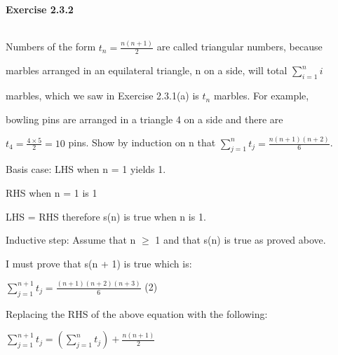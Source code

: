 \documentclass[12pt]{article}
\begin{document}
\begin{title}
    \centering
    {\LARGE\bfseries Exercise 2.3.2}
\end{title}\\

\vspace{10mm} %
Numbers of the form $t_{n} = \frac{n(n + 1)}{2}$ are called triangular numbers, because\par marbles arranged 
in an equilateral triangle, n on a side, will total $\sum_{i=1}^{n} i$\par marbles, which we saw in Exercise 
2.3.1(a) is $t_{n}$ marbles. For example,\par bowling pins are arranged in a triangle 4 on a side and there are\par
$t_{4} = \frac{4 \times 5}{2} = 10$ pins. Show by induction on n that $\sum_{j=1}^{n} t_{j} = \frac{n(n + 1)(n + 2)}{6}$.

\vspace{5mm} %

Basis case: LHS when n = 1 yields 1.\par

\vspace{5mm} %

RHS when n = 1 is 1\par

LHS = RHS therefore s(n) is true when n is 1.\par

Inductive step: Assume that n $\geq$ 1 and that s(n) is true as proved above.\par I must prove that s(n + 1) is true which is:\par

\vspace{5mm} %

$\sum_{j=1}^{n + 1} t_{j} = \frac{(n + 1)(n + 2)(n + 3)}{6}$   \hfil\hfil\hfil (2)\par

\vspace{5mm} %

Replacing the RHS of the above equation with the following:\par

\vspace{5mm} %

$\sum_{j=1}^{n + 1} t_{j} = (\sum_{j=1}^{n} t_{j}) + \frac{n(n + 1)}{2}$\par
\end{document}
